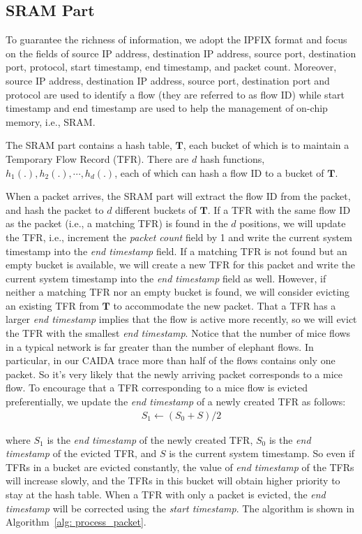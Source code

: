 \documentclass[10pt, conference, letterpaper]{IEEEtran}
\begin{document}
\subsection{SRAM Part}
To guarantee the richness of information, we adopt the IPFIX\cite{trammell_flow_2013} format and focus on the fields of source IP address, destination IP address, source port, destination port, protocol, start timestamp, end timestamp, and packet count. Moreover, source IP address, destination IP address, source port, destination port and protocol are used to identify a flow (they are referred to as flow ID) while start timestamp and end timestamp are used to help the management of on-chip memory, i.e., SRAM.

The SRAM part contains a hash table, $\mathbf{T}$, each bucket of which is to maintain a Temporary Flow Record (TFR). There are $d$ hash functions, $h_1(.), h_2(.), \cdots, h_d(.)$, each of which can hash a flow ID to a bucket of $\mathbf{T}$.

When a packet arrives, the SRAM part will extract the flow ID from the packet, and hash the packet to $d$ different buckets of $\mathbf{T}$. If a TFR with the same flow ID as the packet (i.e., a matching TFR) is found in the $d$ positions, we will update the TFR, i.e., increment the \emph{packet count} field by 1 and write the current system timestamp into the \emph{end timestamp} field. If a matching TFR is not found but an empty bucket is available, we will create a new TFR for this packet and write the current system timestamp into the \emph{end timestamp} field as well. However, if neither a matching TFR nor an empty bucket is found, we will consider evicting an existing TFR from $\mathbf{T}$ to accommodate the new packet. That a TFR has a larger \emph{end timestamp} implies that the flow is active more recently, so we will evict the TFR with the smallest \emph{end timestamp}. Notice that the number of mice flows in a typical network is far greater than the number of elephant flows. In particular, in our CAIDA trace more than half of the flows contains only one packet. So it's very likely that the newly arriving packet corresponds to a mice flow. To encourage that a TFR corresponding to a mice flow is evicted preferentially, we update the \emph{end timestamp} of a newly created TFR as follows:
\begin{eqnarray}
S_1 \gets (S_0 + S)/2
\end{eqnarray}

where $S_1$ is the \emph{end timestamp} of the newly created TFR, $S_0$ is the \emph{end timestamp} of the evicted TFR, and $S$ is the current system timestamp. So even if TFRs in a bucket are evicted constantly, the value of \emph{end timestamp} of the TFRs will increase slowly, and the TFRs in this bucket will obtain higher priority to stay at the hash table. When a TFR with only a packet is evicted, the \emph{end timestamp} will be corrected using the \emph{start timestamp}. The algorithm is shown in Algorithm~\ref{alg: process_packet}.
\end{document}
